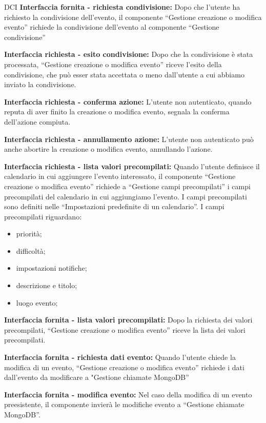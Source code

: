 \begin{listaPersonale}{DCI}
    \textbf{Interfaccia fornita - richiesta condivisione:} Dopo che l'utente ha richiesto la condivisione dell'evento, il componente “Gestione creazione o modifica evento” richiede la condivisione dell'evento al componente “Gestione condivisione”

    \textbf{Interfaccia richiesta - esito condivisione:} Dopo che la condivisione è stata processata, “Gestione creazione o modifica evento” riceve l'esito della condivisione, che può esser stata accettata o meno dall'utente a cui abbiamo inviato la condivisione.

    \textbf{Interfaccia richiesta - conferma azione:} L'utente non autenticato, quando reputa di aver finito la creazione o modifica evento, segnala la conferma dell'azione compiuta.

    \textbf{Interfaccia richiesta - annullamento azione:} L'utente non autenticato può anche abortire la creazione o modifica evento, annullando l'azione.

    \textbf{Interfaccia richiesta - lista valori precompilati:} Quando l'utente definisce il calendario in cui aggiungere l'evento interessato, il componente “Gestione creazione o modifica evento” richiede a “Gestione campi precompilati” i campi precompilati del calendario in cui aggiungiamo l'evento. I campi precompilati sono definiti nelle “Impostazioni predefinite di un calendario”.
    I campi precompilati riguardano:
    \begin{itemize}
        \item priorità;
        \item difficoltà;
        \item impostazioni notifiche;
        \item descrizione e titolo;
        \item luogo evento;
    \end{itemize}

    \textbf{Interfaccia fornita - lista valori precompilati:}  Dopo la richiesta dei valori precompilati, “Gestione creazione o modifica evento” riceve la lista dei valori precompilati.

    \textbf{Interfaccia fornita - richiesta dati evento:} Quando l'utente chiede la modifica di un evento, “Gestione creazione o modifica evento” richiede i dati dall'evento da modificare a "Gestione chiamate MongoDB”

    \textbf{Interfaccia fornita - modifica evento:} Nel caso della modifica di un evento preesistente, il componente invierà le modifiche evento a “Gestione chiamate MongoDB”.


\end{listaPersonale}
